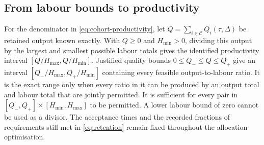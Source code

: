 \subsection{From labour bounds to productivity}

For the denominator in \eqref{eq:cohort-productivity}, let $Q=\sum_{i\in\mathcal C}Q_i(\tau,\Delta)$ be retained output known exactly. With $Q\geq0$ and $H_{\min}>0$, dividing this output by the largest and smallest possible labour totals gives the identified productivity interval $[Q/H_{\max},Q/H_{\min}]$. Justified quality bounds $0\leq Q_-\leq Q\leq Q_+$ give an interval $[Q_-/H_{\max},Q_+/H_{\min}]$ containing every feasible output-to-labour ratio. It is the exact range only when every ratio in it can be produced by an output total and labour total that are jointly permitted. It is sufficient for every pair in $[Q_-,Q_+]\times[H_{\min},H_{\max}]$ to be permitted. A lower labour bound of zero cannot be used as a divisor. The acceptance times and the recorded fractions of requirements still met in \eqref{eq:retention} remain fixed throughout the allocation optimisation.
